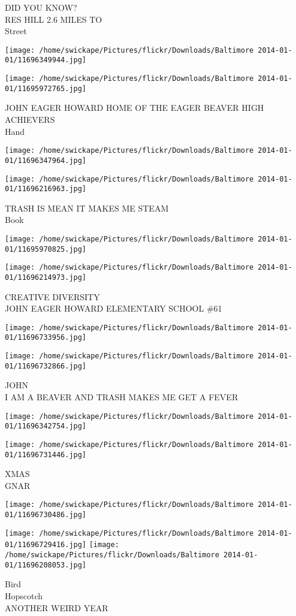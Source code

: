 \documentclass[10pt,letterpaper]{article}
\begin{document}
DID YOU KNOW?\\
RES HILL 2.6 MILES TO\\
Street
\pagebreak

\texttt{[image: /home/swickape/Pictures/flickr/Downloads/Baltimore 2014-01-01/11696349944.jpg]}

\vspace{0.25in}
\texttt{[image: /home/swickape/Pictures/flickr/Downloads/Baltimore 2014-01-01/11695972765.jpg]}

JOHN EAGER HOWARD HOME OF THE EAGER BEAVER HIGH ACHIEVERS\\
Hand
\pagebreak

\texttt{[image: /home/swickape/Pictures/flickr/Downloads/Baltimore 2014-01-01/11696347964.jpg]}

\vspace{0.25in}
\texttt{[image: /home/swickape/Pictures/flickr/Downloads/Baltimore 2014-01-01/11696216963.jpg]}

TRASH IS MEAN IT MAKES ME STEAM\\
Book
\pagebreak

\texttt{[image: /home/swickape/Pictures/flickr/Downloads/Baltimore 2014-01-01/11695970825.jpg]}

\vspace{0.25in}
\texttt{[image: /home/swickape/Pictures/flickr/Downloads/Baltimore 2014-01-01/11696214973.jpg]}

CREATIVE DIVERSITY\\
JOHN EAGER HOWARD ELEMENTARY SCHOOL \#61
\pagebreak

\texttt{[image: /home/swickape/Pictures/flickr/Downloads/Baltimore 2014-01-01/11696733956.jpg]}

\vspace{0.25in}
\texttt{[image: /home/swickape/Pictures/flickr/Downloads/Baltimore 2014-01-01/11696732866.jpg]}

JOHN\\
I AM A BEAVER AND TRASH MAKES ME GET A FEVER
\pagebreak

\texttt{[image: /home/swickape/Pictures/flickr/Downloads/Baltimore 2014-01-01/11696342754.jpg]}

\vspace{0.25in}
\texttt{[image: /home/swickape/Pictures/flickr/Downloads/Baltimore 2014-01-01/11696731446.jpg]}

XMAS\\
GNAR
\pagebreak

\texttt{[image: /home/swickape/Pictures/flickr/Downloads/Baltimore 2014-01-01/11696730486.jpg]}

\vspace{0.25in}
\texttt{[image: /home/swickape/Pictures/flickr/Downloads/Baltimore 2014-01-01/11696729416.jpg]}
\texttt{[image: /home/swickape/Pictures/flickr/Downloads/Baltimore 2014-01-01/11696208053.jpg]}

Bird\\
Hopscotch\\
ANOTHER WEIRD YEAR
\pagebreak
\end{document}
